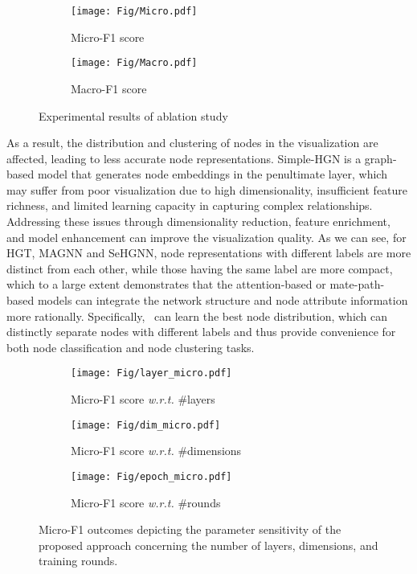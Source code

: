 \begin{figure}[!h]
    \centering
    \begin{flushleft}
	\begin{subfigure}[t]{0.95\linewidth}
		\texttt{[image: Fig/Micro.pdf]}
		\caption{Micro-F1 score}
	\end{subfigure}
	\begin{subfigure}[t]{0.95\linewidth}
		\texttt{[image: Fig/Macro.pdf]}
		\caption{Macro-F1 score}
	\end{subfigure}
	\caption{Experimental results of ablation study}
	\label{fig:ablation33}
    \end{flushleft}
\end{figure}

As a result, the distribution and clustering of nodes in the visualization are affected, leading to less accurate node representations.
% 
Simple-HGN is a graph-based model that generates node embeddings in the penultimate layer, which may suffer from poor visualization due to high dimensionality, insufficient feature richness, and limited learning capacity in capturing complex relationships. 
Addressing these issues through dimensionality reduction, feature enrichment, and model enhancement can improve the visualization quality.
%
As we can see, for HGT, MAGNN and SeHGNN, node representations with different labels are more distinct from each other, while those having the same label are more compact, which to a large extent demonstrates that the attention-based or mate-path-based models can integrate the network structure and node attribute information more rationally.
%
Specifically, \alg~can learn the best node distribution, which can distinctly separate nodes with different labels and thus provide convenience for both node classification and node clustering tasks.

\begin{figure*}[!h]
    \centering
    \begin{flushleft}
	\begin{subfigure}[t]{0.32\linewidth}
		\texttt{[image: Fig/layer\_micro.pdf]}
		\caption{Micro-F1 score \emph{w.r.t.} \#layers}
		\label{fig:layers}
	\end{subfigure}
	\begin{subfigure}[t]{0.32\linewidth}
		\texttt{[image: Fig/dim\_micro.pdf]}
		\caption{Micro-F1 score \emph{w.r.t.} \#dimensions}
		\label{fig:dim}
	\end{subfigure}
	\begin{subfigure}[t]{0.32\linewidth}
		\texttt{[image: Fig/epoch\_micro.pdf]}
		\caption{Micro-F1 score \emph{w.r.t.} \#rounds}
		\label{fig:rounds}
	\end{subfigure}
	\caption{
            Micro-F1 outcomes depicting the parameter sensitivity of the proposed approach concerning the number of layers, dimensions, and training rounds.
            }
	\label{fig:micro-F11}
    \end{flushleft}
\end{figure*}

